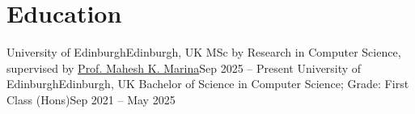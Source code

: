 \section{Education}
  \resumeSubHeadingListStart
    \resumeSubheading
      {University of Edinburgh}{Edinburgh, UK}
      {MSc by Research in Computer Science, supervised by \href{https://homepages.inf.ed.ac.uk/mmarina/}{Prof. Mahesh K. Marina}}{Sep 2025 -- Present}
    \resumeSubheading
      {University of Edinburgh}{Edinburgh, UK}
      {Bachelor of Science in Computer Science; Grade: First Class (Hons)}{Sep 2021 -- May 2025}
  \resumeSubHeadingListEnd
